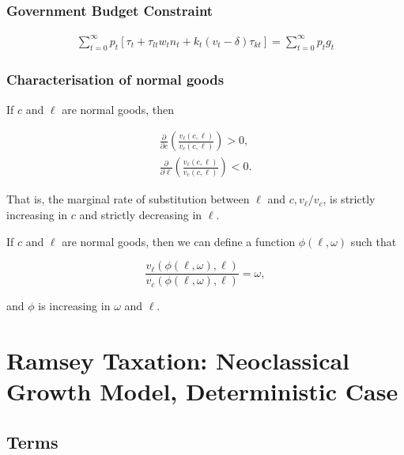 \documentclass[10pt]{article}
\begin{document}
\subsubsection{Government Budget Constraint}

\begin{align}
    \sum_{t=0}^{\infty} p_t\left[\tau_t+\tau_{l t} w_t n_t+k_t\left(v_t-\delta\right) \tau_{k t}\right]=\sum_{t=0}^{\infty} p_t g_t
\end{align}

\subsubsection{Characterisation of normal goods}

\begin{proposition} 
    If $c$ and $\ell$ are normal goods, then

    $$
    \begin{gathered}
    \frac{\partial}{\partial c}\left(\frac{v_{\ell}(c, \ell)}{v_c(c, \ell)}\right)>0, \\
    \frac{\partial}{\partial \ell}\left(\frac{v_{\ell}(c, \ell)}{v_c(c, \ell)}\right)<0 .
    \end{gathered}
    $$
    
    That is, the marginal rate of substitution between $\ell$ and $c, v_{\ell} / v_c$, is strictly increasing in $c$ and strictly decreasing in $\ell$.
\end{proposition}


\begin{proposition} 
    
    If $c$ and $\ell$ are normal goods, then we can define a function $\phi(\ell, \omega)$ such that
    
    $$
    \frac{v_{\ell}(\phi(\ell, \omega), \ell)}{v_c(\phi(\ell, \omega), \ell)}=\omega,
    $$
    
    and $\phi$ is increasing in $\omega$ and $\ell$. 
\end{proposition}

\section{Ramsey Taxation: Neoclassical Growth Model, Deterministic Case}

\subsection{Terms}
\end{document}
